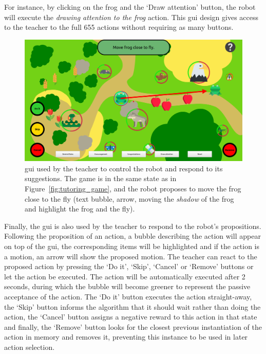 For instance, by clicking on the frog and the `Draw attention' button, the robot will execute the \textit{drawing attention to the frog} action. 
This \gls{gui} design gives access to the teacher to the full 655 actions without requiring as many buttons. %


\begin{figure}[ht]
	\centering
	\includegraphics[width=1\textwidth]{gui.png}
	\captionsetup{width=.9\linewidth}
	\caption{\gls{gui} used by the teacher to control the robot and respond to its suggestions. The game is in the same state as in Figure~\ref{fig:tutoring_game}, and the robot proposes to move the frog close to the fly (text bubble, arrow, moving the \textit{shadow} of the frog and highlight the frog and the fly).}
	\label{fig:tutoring_gui}
\end{figure}


Finally, the \gls{gui} is also used by the teacher to respond to the robot's propositions. Following the proposition of an action, a bubble describing the action will appear on top of the \gls{gui}, the corresponding items will be highlighted and if the action is a motion, an arrow will show the proposed motion. The teacher can react to the proposed action by pressing the `Do it', `Skip', `Cancel' or `Remove' buttons or let the action be executed. The action will be automatically executed after 2 seconds, during which the bubble will become greener to represent the passive acceptance of the action. The `Do it' button executes the action straight-away, the `Skip' button informs the algorithm that it should wait rather than doing the action, the `Cancel' button assigns a negative reward to this action in that state and finally, the `Remove' button looks for the closest previous instantiation of the action in memory and removes it, preventing this instance to be used in later action selection.

